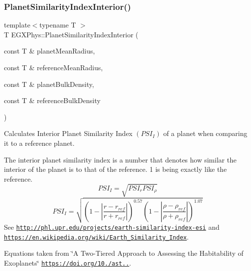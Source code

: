 \subsubsection{\texorpdfstring{Planet\+Similarity\+Index\+Interior()}{PlanetSimilarityIndexInterior()}}
{\footnotesize\ttfamily template$<$typename T $>$ \\
T E\+G\+X\+Phys\+::\+Planet\+Similarity\+Index\+Interior (\begin{DoxyParamCaption}\item[{const T \&}]{planet\+Mean\+Radius,  }\item[{const T \&}]{reference\+Mean\+Radius,  }\item[{const T \&}]{planet\+Bulk\+Density,  }\item[{const T \&}]{reference\+Bulk\+Density }\end{DoxyParamCaption})}



Calculates Interior Planet Similarity Index $(PSI_I)$ of a planet when comparing it to a reference planet. 

The interior planet similarity index is a number that denotes how similar the interior of the planet is to that of the reference. 1 is being exactly like the reference. \[PSI_I=\sqrt{PSI_r PSI_\rho}\] \[PSI_I=\sqrt{\left ( 1 - \left | \frac{r-r_{ref}}{r+r_{ref}} \right | \right )^{0.57} \left ( 1 - \left | \frac{\rho-\rho_{ref}}{\rho+\rho_{ref}} \right | \right )^{1.07}}\] See \href{http://phl.upr.edu/projects/earth-similarity-index-esi}{\tt http\+://phl.\+upr.\+edu/projects/earth-\/similarity-\/index-\/esi} and \href{https://en.wikipedia.org/wiki/Earth_Similarity_Index}{\tt https\+://en.\+wikipedia.\+org/wiki/\+Earth\+\_\+\+Similarity\+\_\+\+Index}.

Equations taken from \char`\"{}\+A Two-\/\+Tiered Approach to Assessing the Habitability of Exoplanets\char`\"{} \href{https://doi.org/10.1089/ast.2010.0592}{\tt https\+://doi.\+org/10./ast..}.


